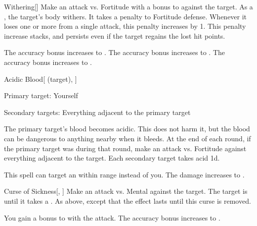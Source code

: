 \lowercase{\hypertarget{spell:Withering}{}}\label{spell:Withering}
\begin{freeability}[Rank 2]{\hypertarget{spell:Withering}{Withering}}[]
Make an attack vs. Fortitude with a  bonus to  against the target.
\hit As a , the target's body withers.
It takes a  penalty to Fortitude defense.
Whenever it loses one or more  from a single attack, this penalty increases by 1.
This penalty increase stacks, and persists even if the target regains the lost hit points.

\rankline
{} The accuracy bonus increases to .
 The accuracy bonus increases to .
 The accuracy bonus increases to .

\end{freeability}
\vspace{0.25em}



\lowercase{\hypertarget{spell:Acidic Blood}{}}\label{spell:Acidic Blood}
\begin{attuneability}[Rank 3]{\hypertarget{spell:Acidic Blood}{Acidic Blood}}[ (target), ]

Primary target: Yourself
\par\noindent
Secondary targets: Everything adjacent to the primary target

The primary target's blood becomes acidic.
This does not harm it, but the blood can be dangerous to anything nearby when it bleeds.
At the end of each round, if the primary target was  during that round, make an attack vs. Fortitude against everything adjacent to the target.
\hit Each secondary target takes acid  \minus1d.

\rankline
{} This spell can target an  within \rngmed range instead of you.
 The damage increases to .

\end{attuneability}
\vspace{0.25em}



\lowercase{\hypertarget{spell:Curse of Sickness}{}}\label{spell:Curse of Sickness}
\begin{freeability}[Rank 3]{\hypertarget{spell:Curse of Sickness}{Curse of Sickness}}[, ]
Make an attack vs. Mental against the target.
\hit The target is  until it takes a .
\crit As above, except that the effect lasts until this curse is removed.

\rankline
{} You gain a  bonus to  with the attack.
 The accuracy bonus increases to .

\end{freeability}
\vspace{0.25em}



